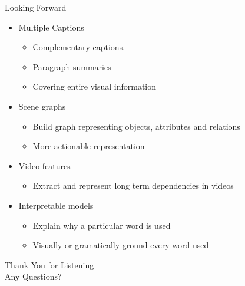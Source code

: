 \documentclass{beamer}
\begin{document}
\begin{frame}{Looking Forward}
\begin{itemize}
    \item Multiple Captions
       \begin{itemize}
           \item Complementary captions.
           \item Paragraph summaries
           \item Covering entire visual information
       \end{itemize}
    \item Scene graphs 
       \begin{itemize}
           \item Build graph representing objects, attributes and relations 
           \item More actionable representation
       \end{itemize}
    \item Video features 
       \begin{itemize}
           \item Extract and represent long term dependencies in videos
       \end{itemize}
    \item Interpretable models
       \begin{itemize}
           \item Explain why a particular word is used
           \item Visually or gramatically ground every word used
       \end{itemize}

\end{itemize}
\end{frame}
\begin{frame}{}
\begin{center}
    \Large Thank You for Listening\\[6mm]
    \Large Any Questions? 
\end{center}
\end{frame}
\end{document}

